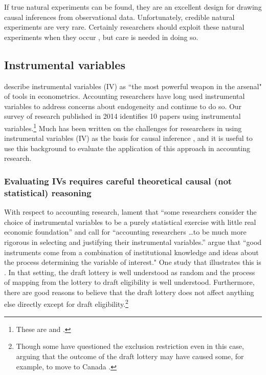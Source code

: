 \documentclass[12pt,reqno,titlepage]{amsart}
\begin{document}
\begin{doublespace}
If true natural experiments can be found, they are an excellent design for drawing causal inferences from observational data. 
Unfortunately, credible natural experiments are very rare.
Certainly researchers should exploit these natural experiments when they occur \citep[e.g.][]{Michels:2015aa,Li:2015he}, but care is needed in doing so.

\subsection{Instrumental variables}
\citet[p.114]{Angrist:2008vk} describe instrumental variables (IV) as ``the most powerful weapon in the arsenal" of tools in econometrics. 
Accounting researchers have long used instrumental variables to address concerns about endogeneity \citep{Larcker:2010fq,Lennox:2012it} and continue to do so.
Our survey of research published in 2014 identifies 10 papers using instrumental variables.\footnote{
These are \citet{Cannon:2014im,Cohen:2014jl,Kim:2014fm,Vermeer:2014bs,Fox:2014io,Guedhami:2013cj,Houston:2014hv,deFranco:2014ct,Erkens:2014hj} and \citet{Correia:2014fp}.}
Much has been written on the challenges for researchers in using instrumental variables (IV) as the basis for causal inference \citep[e.g.,][]{Roberts:2013cz}, and it is useful to use this background to evaluate the application of this approach in accounting research. 

\subsubsection{Evaluating IVs requires careful theoretical causal (not statistical) reasoning}

With respect to accounting research, \citet{Larcker:2010fq} lament that ``some researchers consider the choice of instrumental variables to be a purely statistical exercise with little real economic foundation'' and call for 
``accounting researchers \dots to be much more rigorous in selecting and justifying their instrumental variables.'' 
\citet[p.117]{Angrist:2008vk} argue that ``good instruments come from a combination of institutional knowledge and ideas about the process determining the variable of interest."
One study that illustrates this is \citet{Angrist:1990dk}.
In that setting, the draft lottery is well understood as random and the process of mapping from the lottery to draft eligibility is well understood.
Furthermore, there are good reasons to believe that the draft lottery does not affect anything else directly except for draft eligibility.\footnote{Though some have questioned the exclusion restriction even in this case, arguing that the outcome of the draft lottery may have caused some, for example, to move to Canada \citep[see][]{Imbens:2015aa}.}


\end{doublespace}
\end{document}
